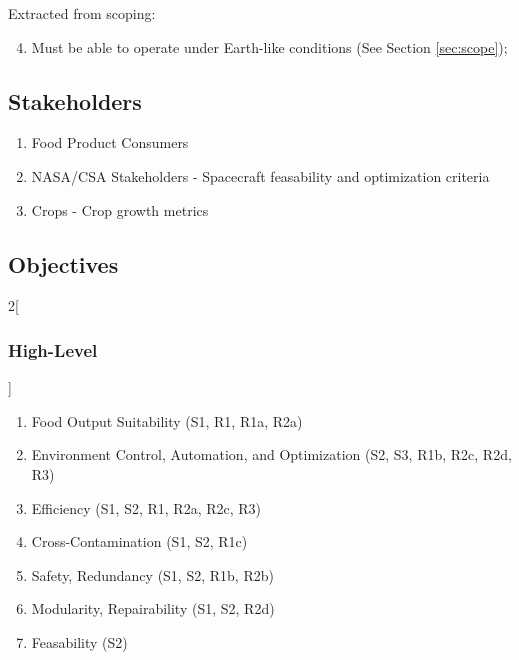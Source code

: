 \documentclass{report}
\begin{document}

Extracted from scoping:
\begin{enumerate}
    \setcounter{enumi}{3}
    \item Must be able to operate under Earth-like conditions (See Section \ref{sec:scope});
\end{enumerate}


\subsection{Stakeholders}
\label{sec:stakeholders}

\begin{enumerate}
    \item Food Product Consumers
    \item NASA/CSA Stakeholders - Spacecraft feasability and optimization criteria
    \item Crops - Crop growth metrics
\end{enumerate}

\newpage

\subsection{Objectives}
\label{sec:objectives}

\begin{multicols}{2}[\subsubsection{High-Level}\label{sec:hlos}]
    \begin{enumerate}
        \item Food Output Suitability \hfill (S1, R1, R1a, R2a)
        \item Environment Control, Automation, and Optimization \hfill (S2, S3, R1b, R2c, R2d, R3)
        \item Efficiency \hfill (S1, S2, R1, R2a, R2c, R3)
        \item Cross-Contamination \hfill (S1, S2, R1c)
        \item Safety, Redundancy \hfill (S1, S2, R1b, R2b)
        \item Modularity, Repairability \hfill (S1, S2, R2d)
        \item Feasability \hfill (S2)
    \end{enumerate}
\end{multicols}
\end{document}

